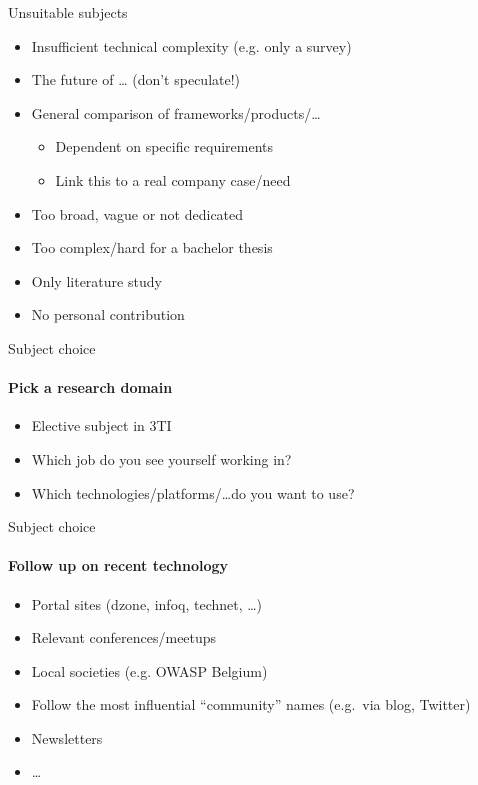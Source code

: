 \documentclass[aspectratio=169]{beamer}
\begin{document}
    \begin{frame}{Unsuitable subjects}
        
        \begin{itemize}
            \item Insufficient technical complexity (e.g. only a survey)
            \item The future of \ldots{} (don't speculate!)
            \item General comparison of frameworks/products/\ldots
            \begin{itemize}
                \item Dependent on specific requirements
                \item Link this to a real company case/need
            \end{itemize}
            \item Too broad, vague or not dedicated
            \item Too complex/hard for a bachelor thesis
            \item Only literature study
            \item No personal contribution
        \end{itemize}
        
    \end{frame}
    
    \begin{frame}{Subject choice}
        \framesubtitle{Pick a research domain}
        
        \begin{itemize}
            \item Elective subject in 3TI
            \item Which job do you see yourself working in?
            \item Which technologies/platforms/\ldots  do you want to use?
        \end{itemize}
        
    \end{frame}
    
    \begin{frame}{Subject choice}
        \framesubtitle{Follow up on recent technology}
        
        \begin{itemize}
            \item Portal sites (dzone, infoq, technet, \ldots)
            \item Relevant conferences/meetups
            \item Local societies (e.g. OWASP Belgium)
            \item Follow the most influential ``community'' names (e.g.\ via blog, Twitter)            
            \item Newsletters
            \item \ldots
        \end{itemize}
        
    \end{frame}
    
\end{document}
